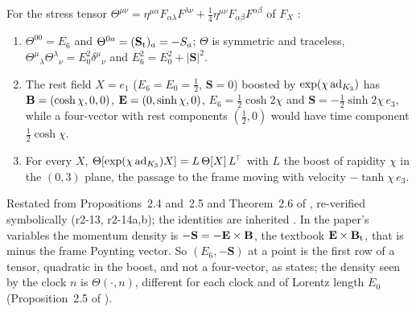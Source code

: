 \begin{proposition}
\label{r2:prop:stress}
For the stress tensor $\Theta^{\mu\nu}=\eta^{\mu\alpha}F_{\alpha\lambda}F^{\lambda\nu}+\tfrac14\eta^{\mu\nu}F_{\alpha\beta}F^{\alpha\beta}$ of $F_X$
\cite{Jackson}:
\begin{enumerate}[label=(\roman*),leftmargin=2.2em]
\item $\Theta^{00}=E_6$ and $\Theta^{0a}=(\mathbf S_{\rm t})_a=-S_a$; $\Theta$ is symmetric and traceless, $\Theta^\mu{}_\lambda\Theta^\lambda{}_\nu=E_0^2\delta^\mu{}_\nu$ and
$E_6^2=E_0^2+|\mathbf S|^2$.
\item The rest field $X=e_1$ ($E_6=E_0=\tfrac12$, $\mathbf S=0$) boosted by $\exp(\chi\operatorname{ad}_{K_3})$ has $\mathbf B=(\cosh\chi,0,0)$, $\mathbf E=(0,\sinh\chi,0)$,
$E_6=\tfrac12\cosh2\chi$ and $\mathbf S=-\tfrac12\sinh2\chi\,e_3$, while a four-vector with rest components $(\tfrac12,0)$ would have time component
$\tfrac12\cosh\chi$.
\item For every $X$, $\Theta[\exp(\chi\operatorname{ad}_{K_3})X]=L\,\Theta[X]\,L^{\!\top}$ with $L$ the boost of rapidity $\chi$ in the $(0,3)$ plane, the passage to the
frame moving with velocity $-\tanh\chi\,e_3$.
\end{enumerate}
\end{proposition}

Restated from Propositions~2.4 and~2.5 and Theorem~2.6 of \cite{RE}, re-verified symbolically (r2-13, r2-14a,b); the identities are inherited
\cite{Rainich1925,LandauLifshitz2}. In the paper's variables the momentum density is $-\mathbf S=-\mathbf E\times\mathbf B$, the textbook $\mathbf E\times\mathbf B_{\rm t}$, that is minus the frame
Poynting vector. So $(E_6,-\mathbf S)$ at a point is the first row of a tensor, quadratic in the boost, and not a
four-vector, as \cite{RE} states; the density seen by the clock $n$ is $\Theta(\cdot,n)$, different for each clock and of Lorentz length $E_0$
(Proposition~2.5 of \cite{RE}).


